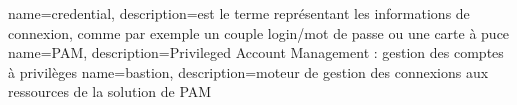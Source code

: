 {
	name=credential,
	description={est le terme représentant les informations de connexion, comme par exemple un couple login/mot de passe ou une carte à puce}
}
{
	name=PAM,
	description={Privileged Account Management : gestion des comptes à privilèges}
}
{
	name=bastion,
	description={moteur de gestion des connexions aux ressources de la solution de PAM}
}
